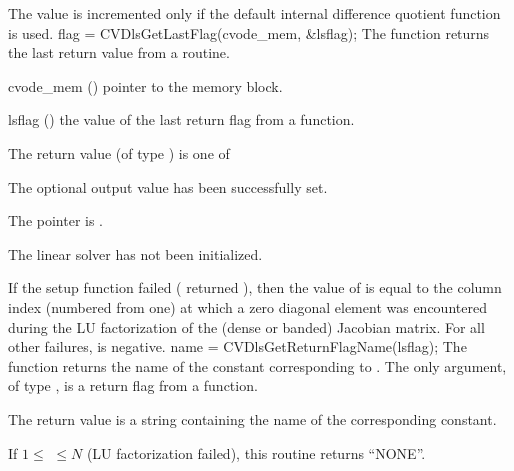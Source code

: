 {
  The value  is incremented only if the default 
  internal difference quotient function is used.
}
{
  flag = CVDlsGetLastFlag(cvode\_mem, \&lsflag);
}
{
  The function  returns the
  last return value from a {\cvdls} routine. 
}
{
  \begin{args}
  \item[cvode\_mem] ()
    pointer to the {\cvodes} memory block.
  \item[lsflag] ()
    the value of the last return flag from a {\cvdls} function.
  \end{args}
}
{
  The return value  (of type ) is one of
  \begin{args}
  \item[\Id{CVDLS\_SUCCESS}] 
    The optional output value has been successfully set.
  \item[\Id{CVDLS\_MEM\_NULL}]
    The  pointer is .
  \item[\Id{CVDLS\_LMEM\_NULL}]
    The {\cvdls} linear solver has not been initialized.
  \end{args}
}
{
  If the {\cvdense} setup function failed ( returned ),
  then the value of  is equal to the column index (numbered from one)
  at which a zero diagonal element was encountered during the LU
  factorization of the (dense or banded) Jacobian matrix.  For all other
  failures,  is negative.
}
{
  name = CVDlsGetReturnFlagName(lsflag);
}
{
  The function  returns the
  name of the {\cvdls} constant corresponding to .
}
{
  The only argument, of type , is a return flag from a {\cvdls}
  function.
}
{
  The return value is a string containing the name of the corresponding constant.

  If $1 \leq $  $ \leq N$ (LU factorization failed), this routine
  returns ``NONE''.
}
{}


